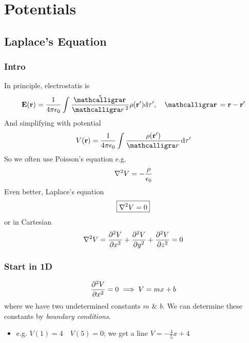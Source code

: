 \documentclass[../main.tex]{subfiles}
\begin{document}
\pagestyle{fancy}

\section{Potentials}
\barh \vspace{1em}

\subsection{Laplace's Equation}

\subsubsection{Intro}
In principle, electrostatis is
\begin{align*}
    \vb E (\vb r) = \ke \int \frac{\vu\scriptr}{\scriptr^2} \rho(\vb r') \dd\tau', \quad \vb \scriptr = \vb r - \vb r'
\end{align*}
And simplifying with potential
\begin{align*}
    V(\vb r) = \ke \int \frac{\rho(\vb r')}{\scriptr} \dd \tau'
\end{align*}
So we often use Poisson's equation e.g.
\begin{align*}
    \laplacian V = -\frac{\rho}{\epsilon_0}
\end{align*}
Even better, Laplace's equation
\begin{align*}
    \boxed{\laplacian V = 0}
\end{align*}
or in Cartesian
\begin{align*}
    \laplacian V = \pdv[2]{V}{x} + \pdv[2]{V}{y} + \pdv[2]{V}{z} = 0
\end{align*}

\subsubsection{Start in 1D}
\begin{align*}
    \pdv[2]{V}{x} = 0 \implies V = mx + b
\end{align*}
where we have two undetermined constants $m$ \& $b$.
We can determine these constants by \textit{boundary conditions}.
\begin{itemize}
    \item e.g. $V(1) = 4 \quad V(5) = 0$; we get a line $V = -\frac{4}{5}x + 4$
\end{itemize}
\end{document}

